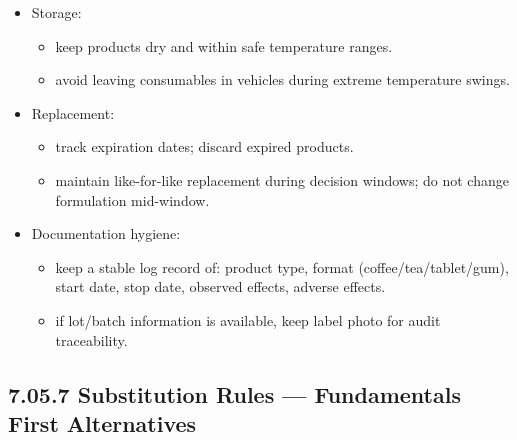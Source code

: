 \documentclass[10pt]{article}
\begin{document}
\begin{itemize}
\item Storage:
  \begin{itemize}
  \item keep products dry and within safe temperature ranges.
  \item avoid leaving consumables in vehicles during extreme temperature swings.
  \end{itemize}
\item Replacement:
  \begin{itemize}
  \item track expiration dates; discard expired products.
  \item maintain like-for-like replacement during decision windows; do not change formulation mid-window.
  \end{itemize}
\item Documentation hygiene:
  \begin{itemize}
  \item keep a stable log record of: product type, format (coffee/tea/tablet/gum), start date, stop date, observed effects, adverse effects.
  \item if lot/batch information is available, keep label photo for audit traceability.
  \end{itemize}
\end{itemize}

\subsection*{7.05.7 Substitution Rules — Fundamentals First Alternatives}
{}
\end{document}
